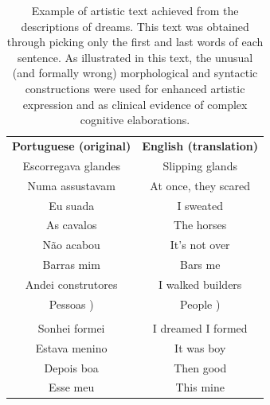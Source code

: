 \documentclass[12pt,fleqn]{article}
\begin{document}
\begin{table}[H] %
	\caption{Example of artistic text achieved from the descriptions of dreams.
	This text was obtained through picking only the first and last words of each sentence.
	As illustrated in this text, the unusual (and formally wrong) morphological and syntactic
	constructions were used for enhanced artistic expression
	and as clinical evidence of complex cognitive elaborations.}\label{tab:comecoFinal}
\vspace{12pt}
\centering{}
 \small
\begin{tabular}{  c | c }
	\textbf{Portuguese (original)}      &                                                \textbf{English (translation)} \\
Escorregava glandes              &                                                Slipping glands         \\
Numa assustavam                  &                                                At once, they scared    \\
Eu suada                         &                                                I sweated               \\
As cavalos                       &                                                The horses              \\
Não acabou                       &                                                It's not over           \\
Barras mim                       &                                                Bars me                 \\
Andei construtores               &                                                I walked builders       \\
Pessoas )                        &                                                People  )               \\
  & \\
Sonhei formei                    &                                                I dreamed I formed      \\
Estava menino                    &                                                It was boy              \\
Depois boa                       &                                                Then good               \\
Esse meu                         &                                                This mine               \\

\end{tabular}
\end{table}
\end{document}

